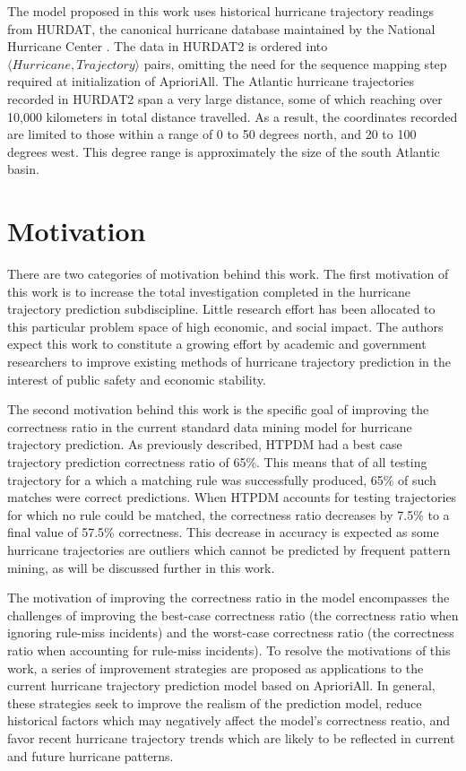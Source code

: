 \documentclass[12pt,conference]{IEEEtran}
\begin{document}
The model proposed in this work uses historical hurricane trajectory readings from HURDAT, the canonical hurricane database maintained by the National Hurricane Center \cite{HURDAT2-original}. The data in HURDAT2 is ordered into $\langle Hurricane, Trajectory \rangle$ pairs, omitting the need for the sequence mapping step required at initialization of AprioriAll. The Atlantic hurricane trajectories recorded in HURDAT2 span a very large distance, some of which reaching over 10,000 kilometers in total distance travelled. As a result, the coordinates recorded are limited to those within a range of 0 to 50 degrees north, and 20 to 100 degrees west. This degree range is approximately the size of the south Atlantic basin.


\section{Motivation}

There are two categories of motivation behind this work. The first motivation of this work is to increase the total investigation completed in the hurricane trajectory prediction subdiscipline. Little research effort has been allocated to this particular problem space of high economic, and social impact. The authors expect this work to constitute a growing effort by academic and government researchers to improve existing methods of hurricane trajectory prediction in the interest of public safety and economic stability.

The second motivation behind this work is the specific goal of improving the correctness ratio in the current standard data mining model for hurricane trajectory prediction. As previously described, HTPDM had a best case trajectory prediction correctness ratio of 65\%. This means that of all testing trajectory for a which a matching rule was successfully produced, 65\% of such matches were correct predictions. When HTPDM accounts for testing trajectories for which no rule could be matched, the correctness ratio decreases by 7.5\% to a final value of 57.5\% correctness. This decrease in accuracy is expected as some hurricane trajectories are outliers which cannot be predicted by frequent pattern mining, as will be discussed further in this work.

The motivation of improving the correctness ratio in the model encompasses the challenges of improving the best-case correctness ratio (the correctness ratio when ignoring rule-miss incidents) and the worst-case correctness ratio (the correctness ratio when accounting for rule-miss incidents). To resolve the motivations of this work, a series of improvement strategies are proposed as applications to the current hurricane trajectory prediction model based on AprioriAll. In general, these strategies seek to improve the realism of the prediction model, reduce historical factors which may negatively affect the model's correctness reatio, and favor recent hurricane trajectory trends which are likely to be reflected in current and future hurricane patterns.
\end{document}
